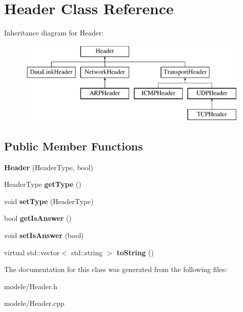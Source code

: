 \hypertarget{class_header}{\section{Header Class Reference}
\label{class_header}
}
Inheritance diagram for Header\-:\begin{figure}[H]
\begin{center}
\leavevmode
\includegraphics[height=4.000000cm]{class_header}
\end{center}
\end{figure}
\subsection*{Public Member Functions}
\begin{DoxyCompactItemize}
\item 
\hypertarget{class_header_a49cb93cde4289c23b41b01d60aa1a114}{{\bfseries Header} (Header\-Type, bool)}\label{class_header_a49cb93cde4289c23b41b01d60aa1a114}

\item 
\hypertarget{class_header_a94de6a0f802e2dc2ee22e5873138d1bf}{Header\-Type {\bfseries get\-Type} ()}\label{class_header_a94de6a0f802e2dc2ee22e5873138d1bf}

\item 
\hypertarget{class_header_af6014d5c01e6f218f77c084bbd37470f}{void {\bfseries set\-Type} (Header\-Type)}\label{class_header_af6014d5c01e6f218f77c084bbd37470f}

\item 
\hypertarget{class_header_aa3ad89035d784d241c57624bef45dcdf}{bool {\bfseries get\-Is\-Answer} ()}\label{class_header_aa3ad89035d784d241c57624bef45dcdf}

\item 
\hypertarget{class_header_a3a9a1fc8092534950698c6639ca2c066}{void {\bfseries set\-Is\-Answer} (bool)}\label{class_header_a3a9a1fc8092534950698c6639ca2c066}

\item 
\hypertarget{class_header_a5ddaa808a18d857934b4920d7b6b89f1}{virtual std\-::vector$<$ std\-::string $>$ {\bfseries to\-String} ()}\label{class_header_a5ddaa808a18d857934b4920d7b6b89f1}

\end{DoxyCompactItemize}


The documentation for this class was generated from the following files\-:\begin{DoxyCompactItemize}
\item 
modele/Header.\-h\item 
modele/Header.\-cpp\end{DoxyCompactItemize}
